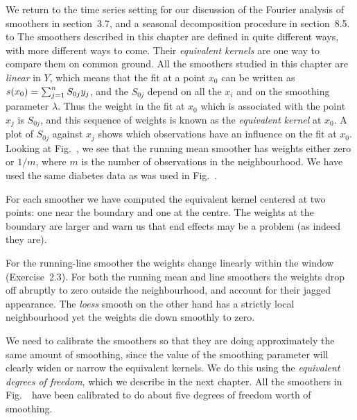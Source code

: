 %
We return to the time series setting for our discussion of   the Fourier analysis
of smoothers in section~3.7, and a seasonal decomposition procedure in
section~8.5.
%
\figname{\hatplot}
\pageinsert
\vbox to 
\endinsert
\Sectionskip
{}
The smoothers described in this chapter are defined in quite different ways, with
%
more different ways to come. 
Their {\sl equivalent kernels} are one way to compare
%
%
them on common ground. 
All the smoothers studied in this chapter  are {\sl linear} in $Y$, which means that the fit at a point $x_0$ can be written as ${s}(x_0)=\sum_{j=1}^n S_{0j}y_j$, and the $S_{0j}$ depend on all the $x_i$ and on the smoothing parameter $\lambda$.
%
Thus the weight in the fit at $x_0$ which is associated with the point $x_j$ is $S_{0j}$, and this sequence of weights is known as the {\em equivalent kernel} at $x_0$. 
A plot of $S_{0j}$ against $x_j$  shows which observations have an influence on the fit at $x_0$. 
%
Looking at Fig.~\hatplot, we see that the running mean smoother has weights
either zero or $1/m$, where $m$ is the number of observations in the neighbourhood.
We have used the same diabetes data as was used in Fig.~\allsmooths.

%
For each smoother we have computed the equivalent kernel centered at two points: one near the boundary and one at the centre. 
The weights at the boundary are larger and warn us that end effects may be a problem (as indeed they are). 

%
For the  running-line smoother  the weights change linearly within the window (Exercise~2.3). 
For both the running mean and line smoothers the weights drop off
abruptly to zero outside the neighbourhood, and account for their jagged appearance.
%
The {\em loess} smooth on the other hand has a strictly local neighbourhood yet the weights die down smoothly to zero.

%
%
%
%
We need to calibrate the smoothers so that they are doing approximately the same amount of smoothing, since the value of the smoothing parameter will clearly widen or narrow the equivalent kernels. 
We do this using the {\sl equivalent degrees of freedom}, which we describe in the next chapter. 
%
%
All the smoothers in Fig.~\hatplot\ have been calibrated to do about five degrees of freedom worth of smoothing. 

